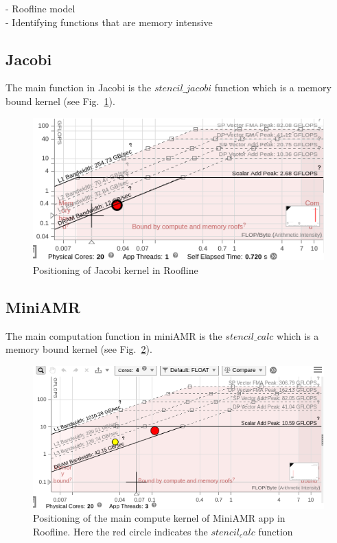 
-	Roofline model \\
-	Identifying functions that are memory intensive \\

\subsection{Jacobi}
The main function in Jacobi is the $stencil\_jacobi$ function which is a memory bound kernel (see Fig.~\ref{fig:roof-jacobi}). 

\begin{figure}[h]%
\begin{center}
\includegraphics[width=1\linewidth]{MEMSYS22/figures/roofline/jacobi.png}
\end{center}
  \vspace{-0.1in}
\caption{Positioning of Jacobi kernel in Roofline}
\label{fig:roof-jacobi}
\vspace{-0.2in}
\end{figure}

\subsection{MiniAMR}
The main computation function in miniAMR is the $stencil\_calc$  which is a memory bound kernel (see Fig.~\ref{fig:roof-miniamr}). 

\begin{figure}[h]%
\begin{center}
\includegraphics[width=1\linewidth]{MEMSYS22/figures/roofline/miniamr.png}
\end{center}
  \vspace{-0.1in}
\caption{Positioning of the main compute kernel of MiniAMR app in Roofline. Here the red circle indicates the $stencil_calc$ function }
\label{fig:roof-miniamr}
\vspace{-0.2in}
\end{figure}

